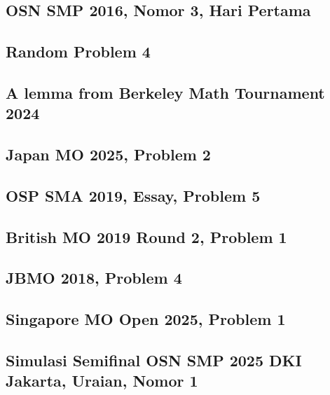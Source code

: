 \subsection{OSN SMP 2016, Nomor 3, Hari Pertama}


\subsection{Random Problem 4}


\subsection{A lemma from Berkeley Math Tournament 2024}


\subsection{Japan MO 2025, Problem 2}


\subsection{OSP SMA 2019, Essay, Problem 5}


\subsection{British MO 2019 Round 2, Problem 1}


\subsection{JBMO 2018, Problem 4}


\subsection{Singapore MO Open 2025, Problem 1}


\subsection{Simulasi Semifinal OSN SMP 2025 DKI Jakarta, Uraian, Nomor 1}


